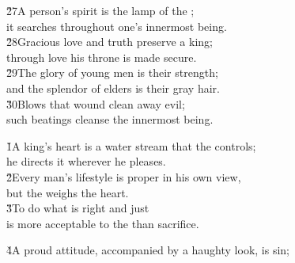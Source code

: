 \begin{poetry}
\poeml \v{27}A person's spirit is the lamp of the ; \\
\poemll    it searches throughout one's innermost being. \\
\poeml \v{28}Gracious love and truth preserve a king; \\
\poemll    through love his throne is made secure. \\
\poeml \v{29}The glory of young men is their strength; \\
\poemll    and the splendor of elders is their gray hair. \\
\poeml \v{30}Blows that wound clean away evil; \\
\poemll    such beatings cleanse the innermost being.
\end{poetry}

\begin{poetry}
\poeml {}
\v{1}A king's heart is a water stream that the  controls; \\
\poeml he directs it wherever he pleases. \\
\poeml \v{2}Every man's lifestyle is proper in his own view, \\
\poemll    but the  weighs the heart. \\
\poeml \v{3}To do what is right and just \\
\poemll    is more acceptable to the  than sacrifice.
\end{poetry}

\v{4}A proud attitude, accompanied by a haughty look, is sin;

